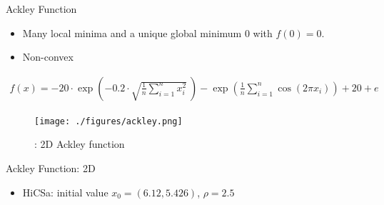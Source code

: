 \documentclass{beamer}
\newcommand{\bmx}{x}
\begin{document}
\begin{frame}{Ackley Function}
\footnotesize{
\begin{itemize}
	\item Many local minima and a unique global
minimum $0$ with $f(0)=0$.
	\item Non-convex
\end{itemize}
\vspace{-0.2cm}
\begin{align*}
	f(\bmx) =
	-20\cdot\exp\left(-0.2\cdot\sqrt{\frac{1}{n}\sum_{i=1}^n
	x_i^2}~\right)-
	\exp\left(\frac{1}{n}\sum_{i=1}^n \cos(2\pi x_i)\right)+20+e
\end{align*}
}
\vspace{-0.4cm}
\begin{figure}[!htbp]
	\centering
	  \texttt{[image: ./figures/ackley.png]}
	  \caption{: 2D Ackley function}
\end{figure}
\end{frame}

\begin{frame}{Ackley Function: 2D}
	\begin{itemize}
		\item HiCSa: initial value $x_0 = (6.12, 5.426)$, $\rho=2.5$
	\end{itemize}

\end{frame}
\end{document}
